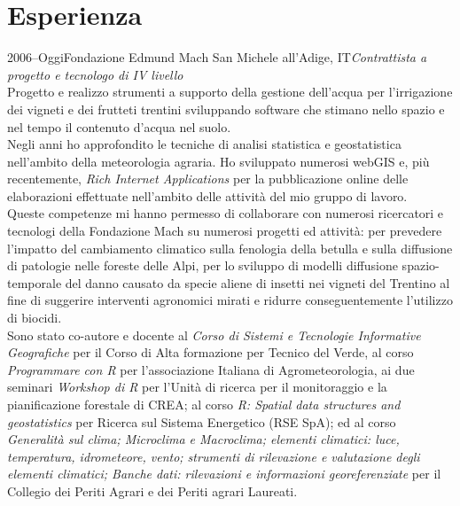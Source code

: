 \documentclass{curriculum}
\begin{document}
    
    \section{Esperienza}
    \begin{entrylist}
    \entry 
        {2006--Oggi}{Fondazione Edmund Mach} {San Michele all'Adige, IT}{\emph{Contrattista a progetto e tecnologo di IV livello}\hfill\vspace{3pt}\\
        Progetto e realizzo strumenti a supporto della gestione dell'acqua per l'irrigazione dei vigneti e dei frutteti trentini sviluppando software che stimano nello spazio e nel tempo il contenuto d'acqua nel suolo.
        \\Negli anni ho approfondito le tecniche di analisi statistica e geostatistica nell'ambito della meteorologia agraria. Ho sviluppato numerosi webGIS e, più recentemente, \textit{Rich Internet Applications} per la pubblicazione online delle elaborazioni effettuate nell'ambito delle attività del mio gruppo di lavoro. 
        \\Queste competenze mi hanno permesso di collaborare con numerosi ricercatori e tecnologi della Fondazione Mach su numerosi progetti ed attività: per prevedere l'impatto del cambiamento climatico sulla fenologia della betulla e sulla diffusione di patologie nelle foreste delle Alpi, per lo sviluppo di modelli diffusione spazio-temporale del danno causato da specie aliene di insetti nei vigneti del Trentino al fine di suggerire interventi agronomici mirati e ridurre conseguentemente l'utilizzo di biocidi.
        \\Sono stato co-autore e docente al \textit{Corso di Sistemi e Tecnologie Informative Geografiche} per il Corso di Alta formazione per Tecnico del Verde, al corso \textit{Programmare con R} per l'associazione Italiana di Agrometeorologia, ai due seminari \textit{Workshop di R} per l'Unità di ricerca per il monitoraggio e la pianificazione forestale di CREA; al corso \textit{R: Spatial data structures and geostatistics} per Ricerca sul Sistema Energetico (RSE SpA); ed al corso \textit{Generalità sul clima; Microclima e Macroclima; elementi climatici: luce, temperatura, idrometeore, vento; strumenti di rilevazione e valutazione degli elementi climatici; Banche dati: rilevazioni e informazioni georeferenziate} per il Collegio dei Periti Agrari e dei Periti agrari Laureati.}
    \end{entrylist}
    
\end{document}
